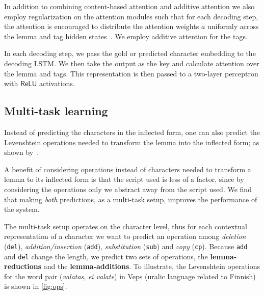 \documentclass[11pt,a4paper]{article}
\begin{document}
In addition to combining content-based attention and additive
attention we also employ regularization on the attention modules such
that for each decoding step, the attention is encouraged to distribute
the attention weights $a$ uniformly across the lemma and tag hidden
states~\cite{DBLP:conf/emnlp/AnastasopoulosN19,
DBLP:conf/naacl/CohnHVYDH16}. We employ additive attention for the tags.

In each decoding step, we pass the gold or predicted character embedding
to the decoding LSTM. We then take the output as the key and calculate
attention over the lemma and tags. This representation is then passed
to a two-layer perceptron with $\mathsf{ReLU}$ activations.



\subsection{Multi-task learning}

Instead of predicting the characters in the inflected form, one can
also predict the Levenshtein operations needed to transform the lemma
into the inflected form; as shown by~.

A benefit of considering operations instead of characters needed to
transform a lemma to its inflected form is that the script used is
less of a factor, since by considering the operations only we abstract
away from the script used. We find that making \emph{both}
predictions, as a multi-task setup, improves the performance of the
system.

The multi-task setup operates on the character level, thus for each
contextual representation of a character we want to predict an
operation among \textit{deletion} (\texttt{del}),
\textit{addition/insertion} (\texttt{add}), \textit{substitution}
(\texttt{sub}) and \textit{copy} (\texttt{cp}). Because \texttt{add}
and \texttt{del} change the length, we predict two sets of operations,
the \textbf{lemma-reductions} and the \textbf{lemma-additions}. To
illustrate, the Levenshtein operations for the word pair
(\emph{valatas}, \emph{ei valate}) in Veps (uralic language related to
Finnish) is shown in \cref{fig:ops}.
\end{document}
